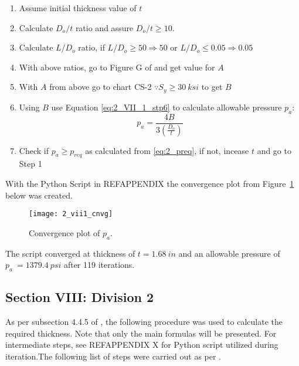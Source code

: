 \begin{enumerate}
	\item Assume initial thickness value of $t$
	\item Calculate $D_o/t$ ratio and assure $D_o/t \geq 10$.
	\item Calculate $L/D_o$ ratio, if $L/D_o \geq 50 \Rightarrow 50$ or  $L/D_o \leq 0.05 \Rightarrow 0.05$
	\item With above ratios, go to Figure G of \citep{ASMEbvpcIID} and get value for $A$
	\item With $A$ from above go to chart CS-2 $\because S_y \geq 30 \ ksi$ to get $B$
	\item Using $B$ use Equation \ref{eq:2_VII_1_stp6} to calculate allowable pressure $p_a$:
		\begin{equation}
			\label{eq:2_VII1_stp6}
			p_a = \frac{4B}{3 \left(\frac{D_o}{t} \right)}
		\end{equation}
	\item Check if $p_a \geq p_{req}$ as calculated from \ref{eq:2_preq}, if not, incease $t$ and go to Step 1\\
	
\end{enumerate}

With the Python Script in REFAPPENDIX the convergence plot from Figure~\ref{fig:2_vii1_cnvg} below was created.
\begin{figure}[!htbp]
    \centering
    \texttt{[image: 2\_vii1\_cnvg]}
    \caption{Convergence plot of $p_a$.}
    \label{fig:2_vii1_cnvg}
\end{figure}

The script converged at thickness of $t = 1.68\ in$ and an allowable pressure of $p_a~= 1379.4\ psi$ after 119 iterations. 


\subsection{Section VIII: Division 2}
As per subsection 4.4.5 of \citep{ASMEbvpcVII2}, the following procedure was used to calculate the required thickness. Note that only the main formulas will be presented. For intermediate steps, see REFAPPENDIX X for Python script utilized during iteration.The following list of steps were carried out as per \citep{ASMEbvpcVII2}.

